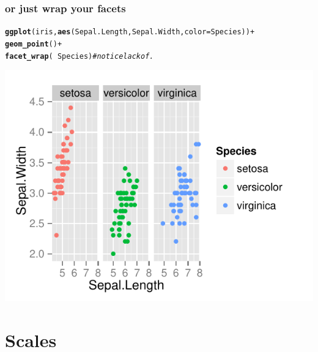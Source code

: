 \documentclass{beamer}\usepackage[]{graphicx}\usepackage[]{color}
\makeatletter
\newcommand{\hlcom}[1]{\textcolor[rgb]{0.678,0.584,0.686}{\textit{#1}}}%
\newcommand{\hlopt}[1]{\textcolor[rgb]{0,0,0}{#1}}%
\newcommand{\hlstd}[1]{\textcolor[rgb]{0.345,0.345,0.345}{#1}}%
\newcommand{\hlkwc}[1]{\textcolor[rgb]{0.333,0.667,0.333}{#1}}%
\newcommand{\hlkwd}[1]{\textcolor[rgb]{0.737,0.353,0.396}{\textbf{#1}}}%
\newenvironment{kframe}{%
 \def\at@end@of@kframe{}%
 \ifinner\ifhmode%
  \def\at@end@of@kframe{\end{minipage}}%
  \begin{minipage}{\columnwidth}%
 \fi\fi%
 \def\FrameCommand##1{\hskip\@totalleftmargin \hskip-\fboxsep
 \colorbox{shadecolor}{##1}\hskip-\fboxsep
     \hskip-\linewidth \hskip-\@totalleftmargin \hskip\columnwidth}%
 \MakeFramed {\advance\hsize-\width
   \@totalleftmargin\z@ \linewidth\hsize
   \@setminipage}}%
 {\par\unskip\endMakeFramed%
 \at@end@of@kframe}
\newenvironment{knitrout}{}{} %
\makeatother
\begin{document}
\begin{frame}[fragile]
\frametitle{or just wrap your facets}
\begin{knitrout}\footnotesize
{}\color{fgcolor}\begin{kframe}
\begin{alltt}
\hlkwd{ggplot}\hlstd{(iris,} \hlkwd{aes}\hlstd{(Sepal.Length, Sepal.Width,} \hlkwc{color} \hlstd{= Species))} \hlopt{+}
\hlkwd{geom_point}\hlstd{()} \hlopt{+}
\hlkwd{facet_wrap}\hlstd{(} \hlopt{~} \hlstd{Species)} \hlcom{# notice lack of .}
\end{alltt}
\end{kframe}

{\centering \includegraphics[width=.75\linewidth]{figure/facet_wrap} 

}



\end{knitrout}
\end{frame}


\section*{Scales}
\frame{\sectionpage}

\end{document}
